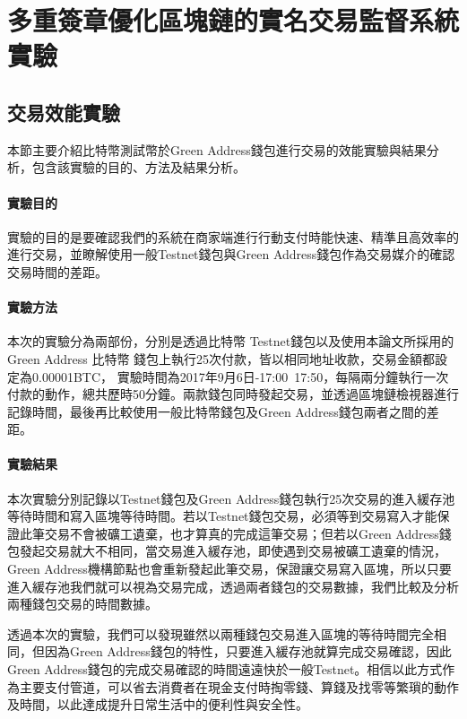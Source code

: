	\section{多重簽章優化區塊鏈的實名交易監督系統實驗}
		\subsection{交易效能實驗}
		本節主要介紹比特幣測試幣於Green Address錢包進行交易的效能實驗與結果分析，包含該實驗的目的、方法及結果分析。

			\paragraph{實驗目的}實驗的目的是要確認我們的系統在商家端進行行動支付時能快速、精準且高效率的進行交易，並瞭解使用一般Testnet錢包與Green Address錢包作為交易媒介的確認交易時間的差距。
			\paragraph{實驗方法}本次的實驗分為兩部份，分別是透過比特幣 Testnet錢包以及使用本論文所採用的Green Address 比特幣 錢包上執行25次付款，皆以相同地址收款，交易金額都設定為0.00001BTC， 實驗時間為2017年9月6日-17:00~17:50，每隔兩分鐘執行一次付款的動作，總共歷時50分鐘。兩款錢包同時發起交易，並透過區塊鏈檢視器進行記錄時間，最後再比較使用一般比特幣錢包及Green Address錢包兩者之間的差距。
			\paragraph{實驗結果}本次實驗分別記錄以Testnet錢包及Green Address錢包執行25次交易的進入緩存池等待時間和寫入區塊等待時間。若以Testnet錢包交易，必須等到交易寫入才能保證此筆交易不會被礦工遺棄，也才算真的完成這筆交易；但若以Green Address錢包發起交易就大不相同，當交易進入緩存池，即使遇到交易被礦工遺棄的情況，Green Address機構節點也會重新發起此筆交易，保證讓交易寫入區塊，所以只要進入緩存池我們就可以視為交易完成，透過兩者錢包的交易數據，我們比較及分析兩種錢包交易的時間數據。


透過本次的實驗，我們可以發現雖然以兩種錢包交易進入區塊的等待時間完全相同，但因為Green Address錢包的特性，只要進入緩存池就算完成交易確認，因此Green Address錢包的完成交易確認的時間遠遠快於一般Testnet。相信以此⽅式作為主要⽀付管道，可以省去消費者在現金⽀付時掏零錢、算錢及找零等繁瑣的動作及時間，以此達成提升⽇常⽣活中的便利性與安全性。